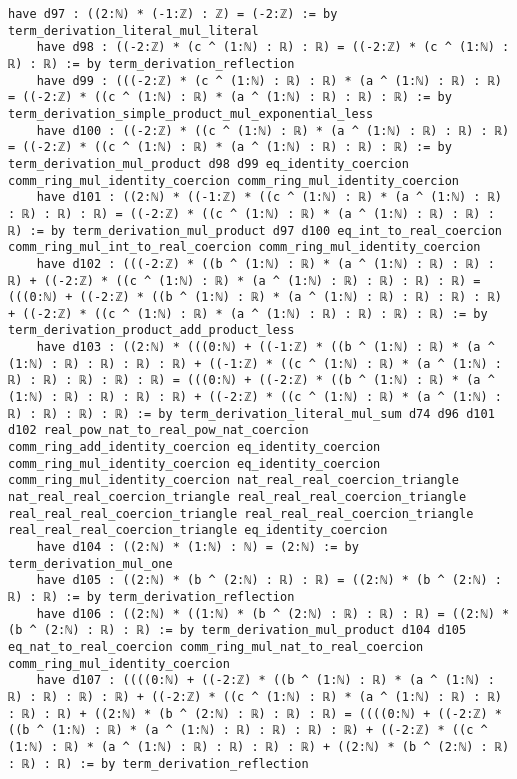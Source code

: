 \documentclass{article}
\begin{document}
\begin{tcolorbox}[colback=white!10, width=\linewidth]
\begin{lstlisting}[language=Lean4]
    have d97 : ((2:ℕ) * (-1:ℤ) : ℤ) = (-2:ℤ) := by term_derivation_literal_mul_literal
    have d98 : ((-2:ℤ) * (c ^ (1:ℕ) : ℝ) : ℝ) = ((-2:ℤ) * (c ^ (1:ℕ) : ℝ) : ℝ) := by term_derivation_reflection
    have d99 : (((-2:ℤ) * (c ^ (1:ℕ) : ℝ) : ℝ) * (a ^ (1:ℕ) : ℝ) : ℝ) = ((-2:ℤ) * ((c ^ (1:ℕ) : ℝ) * (a ^ (1:ℕ) : ℝ) : ℝ) : ℝ) := by term_derivation_simple_product_mul_exponential_less
    have d100 : ((-2:ℤ) * ((c ^ (1:ℕ) : ℝ) * (a ^ (1:ℕ) : ℝ) : ℝ) : ℝ) = ((-2:ℤ) * ((c ^ (1:ℕ) : ℝ) * (a ^ (1:ℕ) : ℝ) : ℝ) : ℝ) := by term_derivation_mul_product d98 d99 eq_identity_coercion comm_ring_mul_identity_coercion comm_ring_mul_identity_coercion
    have d101 : ((2:ℕ) * ((-1:ℤ) * ((c ^ (1:ℕ) : ℝ) * (a ^ (1:ℕ) : ℝ) : ℝ) : ℝ) : ℝ) = ((-2:ℤ) * ((c ^ (1:ℕ) : ℝ) * (a ^ (1:ℕ) : ℝ) : ℝ) : ℝ) := by term_derivation_mul_product d97 d100 eq_int_to_real_coercion comm_ring_mul_int_to_real_coercion comm_ring_mul_identity_coercion
    have d102 : (((-2:ℤ) * ((b ^ (1:ℕ) : ℝ) * (a ^ (1:ℕ) : ℝ) : ℝ) : ℝ) + ((-2:ℤ) * ((c ^ (1:ℕ) : ℝ) * (a ^ (1:ℕ) : ℝ) : ℝ) : ℝ) : ℝ) = (((0:ℕ) + ((-2:ℤ) * ((b ^ (1:ℕ) : ℝ) * (a ^ (1:ℕ) : ℝ) : ℝ) : ℝ) : ℝ) + ((-2:ℤ) * ((c ^ (1:ℕ) : ℝ) * (a ^ (1:ℕ) : ℝ) : ℝ) : ℝ) : ℝ) := by term_derivation_product_add_product_less
    have d103 : ((2:ℕ) * (((0:ℕ) + ((-1:ℤ) * ((b ^ (1:ℕ) : ℝ) * (a ^ (1:ℕ) : ℝ) : ℝ) : ℝ) : ℝ) + ((-1:ℤ) * ((c ^ (1:ℕ) : ℝ) * (a ^ (1:ℕ) : ℝ) : ℝ) : ℝ) : ℝ) : ℝ) = (((0:ℕ) + ((-2:ℤ) * ((b ^ (1:ℕ) : ℝ) * (a ^ (1:ℕ) : ℝ) : ℝ) : ℝ) : ℝ) + ((-2:ℤ) * ((c ^ (1:ℕ) : ℝ) * (a ^ (1:ℕ) : ℝ) : ℝ) : ℝ) : ℝ) := by term_derivation_literal_mul_sum d74 d96 d101 d102 real_pow_nat_to_real_pow_nat_coercion comm_ring_add_identity_coercion eq_identity_coercion comm_ring_mul_identity_coercion eq_identity_coercion comm_ring_mul_identity_coercion nat_real_real_coercion_triangle nat_real_real_coercion_triangle real_real_real_coercion_triangle real_real_real_coercion_triangle real_real_real_coercion_triangle real_real_real_coercion_triangle eq_identity_coercion
    have d104 : ((2:ℕ) * (1:ℕ) : ℕ) = (2:ℕ) := by term_derivation_mul_one
    have d105 : ((2:ℕ) * (b ^ (2:ℕ) : ℝ) : ℝ) = ((2:ℕ) * (b ^ (2:ℕ) : ℝ) : ℝ) := by term_derivation_reflection
    have d106 : ((2:ℕ) * ((1:ℕ) * (b ^ (2:ℕ) : ℝ) : ℝ) : ℝ) = ((2:ℕ) * (b ^ (2:ℕ) : ℝ) : ℝ) := by term_derivation_mul_product d104 d105 eq_nat_to_real_coercion comm_ring_mul_nat_to_real_coercion comm_ring_mul_identity_coercion
    have d107 : ((((0:ℕ) + ((-2:ℤ) * ((b ^ (1:ℕ) : ℝ) * (a ^ (1:ℕ) : ℝ) : ℝ) : ℝ) : ℝ) + ((-2:ℤ) * ((c ^ (1:ℕ) : ℝ) * (a ^ (1:ℕ) : ℝ) : ℝ) : ℝ) : ℝ) + ((2:ℕ) * (b ^ (2:ℕ) : ℝ) : ℝ) : ℝ) = ((((0:ℕ) + ((-2:ℤ) * ((b ^ (1:ℕ) : ℝ) * (a ^ (1:ℕ) : ℝ) : ℝ) : ℝ) : ℝ) + ((-2:ℤ) * ((c ^ (1:ℕ) : ℝ) * (a ^ (1:ℕ) : ℝ) : ℝ) : ℝ) : ℝ) + ((2:ℕ) * (b ^ (2:ℕ) : ℝ) : ℝ) : ℝ) := by term_derivation_reflection

\end{lstlisting}
\end{tcolorbox}
\end{document}
